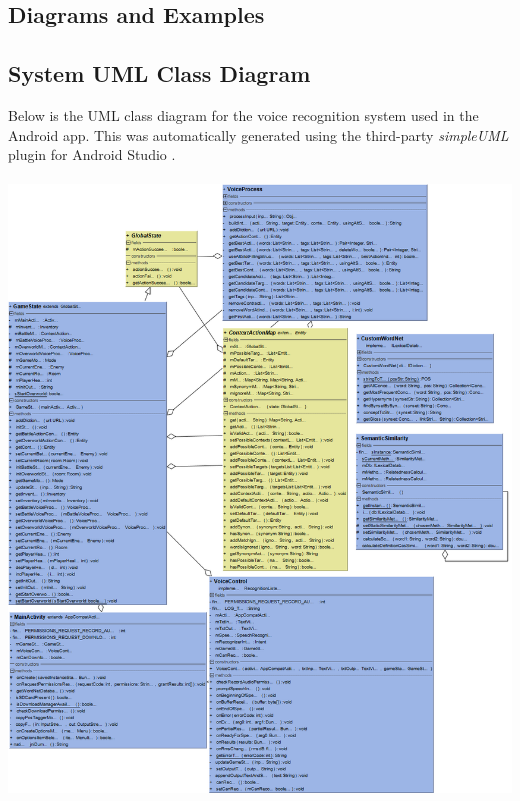 \documentclass[11pt]{article}
\begin{document}
\begin{appendices}
\newpage
\section{Diagrams and Examples}
\subsection{System UML Class Diagram}
\label{appendix:system-uml}
Below is the UML class diagram for the voice recognition system used in the Android app. This was automatically generated using the third-party \textit{simpleUML} plugin for Android Studio \cite{RefWorks:108}.
\\
\\
\includegraphics[scale=0.37]{system-uml.png}

\newpage

\end{appendices}
\end{document}
